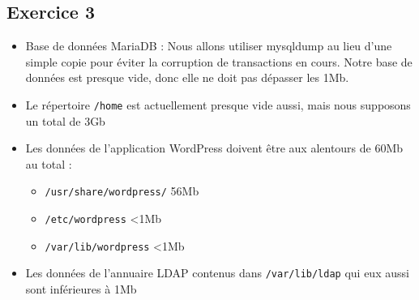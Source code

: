 \documentclass{report}
\begin{document}
\subsection{Exercice 3}

\begin{itemize}
  \item Base de données MariaDB : Nous allons utiliser mysqldump au lieu d'une simple copie pour
      éviter la corruption de transactions en cours. Notre base de données est presque vide, donc
      elle ne doit pas dépasser les 1Mb.
  \item Le répertoire \texttt{/home} est actuellement presque vide aussi, mais nous supposons un
        total de 3Gb
  \item Les données de l'application WordPress doivent être aux alentours de 60Mb au total :
      \begin{itemize}
        \item \texttt{/usr/share/wordpress/} 56Mb
        \item \texttt{/etc/wordpress} <1Mb
        \item \texttt{/var/lib/wordpress} <1Mb
      \end{itemize}
  \item Les données de l'annuaire LDAP contenus dans \texttt{/var/lib/ldap} qui eux aussi sont
  inférieures à 1Mb
\end{itemize}
\end{document}
